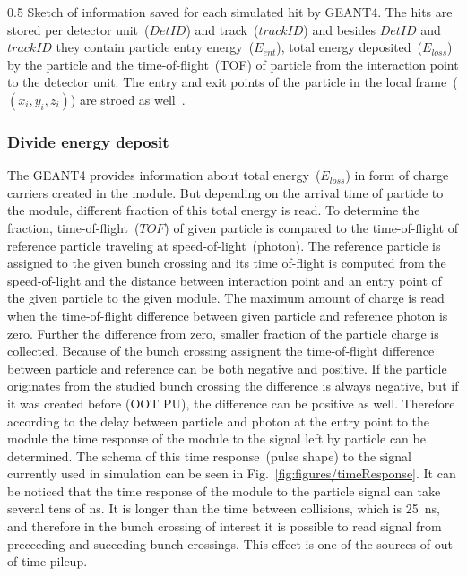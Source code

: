                  {0.5}       %
                 { Sketch of information saved for each simulated hit by GEANT4. The hits are stored per detector unit~($DetID$) and track~($trackID$) and besides $DetID$ and $trackID$ they contain particle entry energy~($E_{ent}$), total energy deposited~($E_{loss}$) by the particle and the time-of-flight~(TOF) of particle from the interaction point to the detector unit. The entry and exit points of the particle in the local frame~($(x_{i},y_{i},z_{i})$) are stroed as well~\cite{website:simuBasics}. }

\subsubsection{Divide energy deposit~\label{sec:divide}}

The GEANT4 provides information about total energy~($E_{loss}$) in form of charge carriers created in the module. But depending on the arrival time of particle to the module, different fraction of this total energy is read. To determine the fraction, time-of-flight~($TOF$) of given particle is compared to the time-of-flight of reference particle traveling at speed-of-light~(photon). The reference particle is assigned to the given bunch crossing and its time of-flight is computed from the speed-of-light and the distance between interaction point and an entry point of the given particle to the given module. The maximum amount of charge is read when the time-of-flight difference between given particle and reference photon is zero. Further the difference from zero, smaller fraction of the particle charge is collected. Because of the bunch crossing assignent the time-of-flight difference between particle and reference can be both negative and positive. If the particle originates from the studied bunch crossing the difference is always negative, but if it was created before (OOT PU), the difference can be positive as well. Therefore according to the delay between particle and photon at the entry point to the module the time response of the module to the signal left by particle can be determined. The schema of this time response~(pulse shape) to the signal currently used in simulation can be seen in Fig.~\ref{fig:figures/timeResponse}. It can be noticed that the time response of the module to the particle signal can take several tens of ns. It is longer than the time between collisions, which is 25~ns, and therefore in the bunch crossing of interest it is possible to read signal from preceeding and suceeding bunch crossings. This effect is one of the sources of out-of-time pileup.


